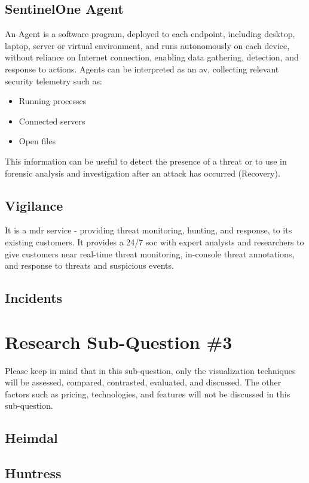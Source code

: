 \begin{multicols}{2}
      \subsection{SentinelOne Agent}

      An Agent is a software program, deployed to each endpoint, including desktop, laptop, server or virtual environment,
      and runs autonomously on each device, without reliance on Internet connection, enabling data gathering, detection, and
      response to actions. Agents can be interpreted as an \acrshort{av}, collecting relevant security telemetry such as:
      \begin{itemize}
            \item Running processes
            \item Connected servers
            \item Open files
      \end{itemize}
      This information can be useful to detect the presence of a threat or to use in forensic analysis and investigation after
      an attack has occurred (Recovery).

      \subsection{Vigilance}
      It is a \acrshort{mdr} service - providing threat monitoring, hunting, and response, to its existing customers. It
      provides a 24/7 \acrshort{soc} with expert analysts and researchers to give customers near real-time threat monitoring,
      in-console threat annotations, and response to threats and suspicious events.
      \subsection{Incidents}

      \section{Research Sub-Question \#3}
      Please keep in mind that in this sub-question, only the visualization techniques will be assessed, compared, contrasted,
      evaluated, and discussed. The other factors such as pricing, technologies, and features will not be discussed in this sub-question.
      \subsection{Heimdal\textregistered}
      \subsection{Huntress}

\end{multicols}
